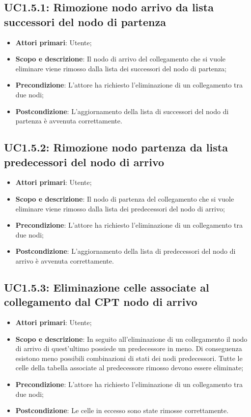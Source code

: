 \subsection{UC1.5.1: Rimozione nodo arrivo da lista successori del nodo di partenza} 
\begin{itemize} 
	\item{\textbf{Attori primari}: Utente;} 
	\item{\textbf{Scopo e descrizione}: Il nodo di arrivo del collegamento che si vuole eliminare viene rimosso dalla lista dei successori del nodo di partenza;} 
	\item{\textbf{Precondizione}: L'attore ha richiesto l'eliminazione di un collegamento tra due nodi;} 
	\item{\textbf{Postcondizione}: L'aggiornamento della lista di successori del nodo di partenza è avvenuta correttamente.} 
\end{itemize} 
\subsection{UC1.5.2: Rimozione nodo partenza da lista predecessori del nodo di arrivo} 
\begin{itemize} 
	\item{\textbf{Attori primari}: Utente;} 
	\item{\textbf{Scopo e descrizione}: Il nodo di partenza del collegamento che si vuole eliminare viene rimosso dalla lista dei predecessori del nodo di arrivo;} 
	\item{\textbf{Precondizione}: L'attore ha richiesto l'eliminazione di un collegamento tra due nodi;} 
	\item{\textbf{Postcondizione}: L'aggiornamento della lista di predecessori del nodo di arrivo è avvenuta correttamente.} 
\end{itemize} 
\subsection{UC1.5.3: Eliminazione celle associate al collegamento dal CPT nodo di arrivo} 
\begin{itemize} 
	\item{\textbf{Attori primari}: Utente;} 
	\item{\textbf{Scopo e descrizione}: In seguito all'eliminazione di un collegamento il nodo di arrivo di quest'ultimo possiede un predecessore in meno. Di conseguenza esistono meno possibili combinazioni di stati dei nodi predecessori. Tutte le celle della tabella associate al predecessore rimosso devono essere eliminate;} 
	\item{\textbf{Precondizione}: L'attore ha richiesto l'eliminazione di un collegamento tra due nodi;} 
	\item{\textbf{Postcondizione}: Le celle in eccesso sono state rimosse correttamente.} 
\end{itemize} 
